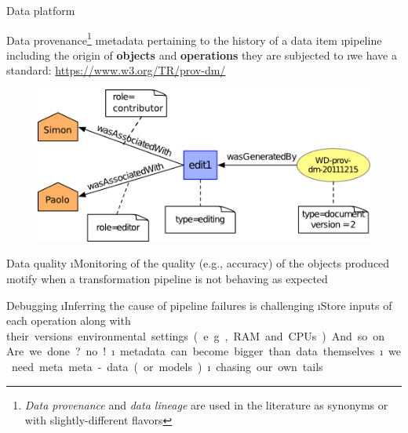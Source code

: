 \begin{frame}[allowframebreaks]{Data platform}
\framebreak

Data provenance\footnote{\emph{Data provenance} and \emph{data lineage} are used in the literature as synonyms or with slightly-different flavors}
\i metadata pertaining to the history of a data item
\i pipeline including the origin of \textbf{objects} and \textbf{operations} they are subjected to
\i we have a standard: \url{https://www.w3.org/TR/prov-dm/}

\begin{figure}
    \centering
    \includegraphics[width=.5\linewidth]{imgs/prov.PNG}
\end{figure}

\framebreak

Data quality
\i Monitoring of the quality (e.g., accuracy) of the objects produced
\i notify when a transformation pipeline is not behaving as expected

Debugging 
\i Inferring the cause of pipeline failures is challenging
\i Store inputs of each operation along with 
\si their versions
\si environmental settings (e.g., RAM and CPUs)

And so on...

\framebreak

Are we done? no!
\i metadata can become bigger than data themselves
\i we need meta meta-data (or models)...
\i ... chasing our own tails
\end{frame}

